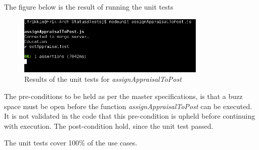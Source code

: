 \documentclass[a4paper,12pt]{article}
\begin{document}
The figure below is the result of running the unit tests


	\begin{figure}[H]
		\centering
		\includegraphics[width=0.8\textwidth]{Figures/assignAppraisalToPost_result.png}
		\caption{Results of the unit tests for \textit{assignAppraisalToPost}}
	\end{figure}

The pre-conditions to be held as per the master specifications, is that a buzz space must be open before the function \textit{assignAppraisalToPost} can be executed. It is not validated in the code that this pre-condition is upheld before continuing with execution. The post-condition hold, since the unit test passed.

The unit tests cover 100\% of the use cases.
\end{document}
